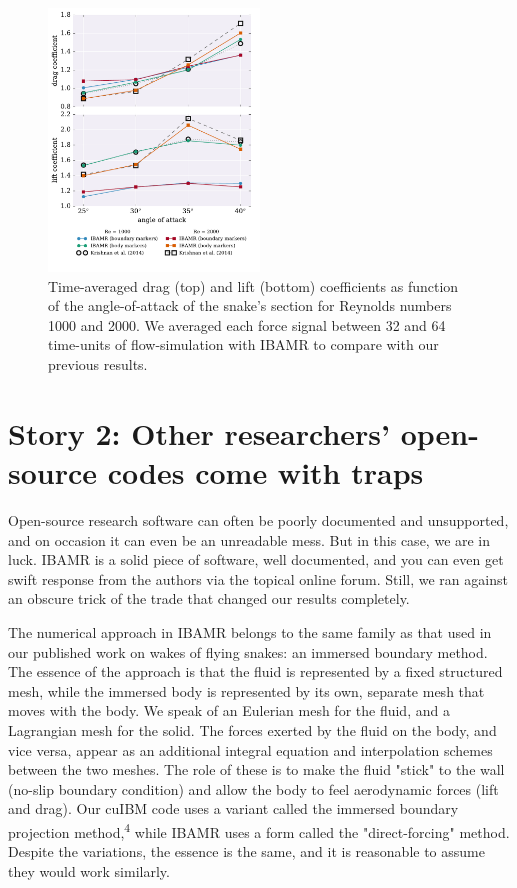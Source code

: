 \documentclass[9pt,twocolumn,twoside]{article}
\newlength{\up}
\begin{document}
\begin{figure}[h]
\centering
\includegraphics[width=0.5\textwidth]{./figures/ibamr/ibamr_forceCoefficientsVsAoA.pdf}
\caption{
Time-averaged drag (top) and lift (bottom) coefficients as function of the angle-of-attack of the snake's section for Reynolds numbers 1000 and 2000.
We averaged each force signal between 32 and 64 time-units of flow-simulation with IBAMR to compare with our previous results.}
\label{figure6}
\end{figure}



\section*{Story 2: Other researchers' open-source codes come with traps}

Open-source research software can often be poorly documented and unsupported, and on occasion it can even be an unreadable mess. 
But in this case, we are in luck.
IBAMR is a solid piece of software, well documented, and you can even get swift response from the authors via the topical online forum.
Still, we ran against an obscure trick of the trade that changed our results completely. 

The numerical approach in IBAMR belongs to the same family as that used in our published work on wakes of flying snakes: an immersed boundary method. 
The essence of the approach is that the fluid is represented by a fixed structured mesh, while the immersed body is represented by its own, separate mesh that moves with the body. 
We speak of an Eulerian mesh for the fluid, and a Lagrangian mesh for the solid. 
The forces exerted by the fluid on the body, and vice versa, appear as an additional integral equation and interpolation schemes between the two meshes. 
The role of these is to make the fluid "stick" to the wall (no-slip boundary condition) and allow the body to feel aerodynamic forces (lift and drag).
Our cuIBM code uses a variant called the immersed boundary projection method,\textsuperscript{4} while IBAMR uses a form called the "direct-forcing" method. 
Despite the variations, the essence is the same, and it is reasonable to assume they would work similarly.
\end{document}
